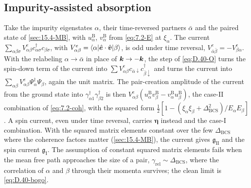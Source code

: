 \subsection*{Impurity-assisted absorption}

Take the impurity eigenstates $\alpha$, their time-reversed partners $\bar\alpha$ and the paired state of \cref{sec:15.4-MB}, with $u^{\mathrm{B}}_\alpha$, $v^{\mathrm{B}}_\alpha$ from \cref{eq:7.2-E} at $\xi_\alpha$. The current $\sum_{\alpha\beta\sigma}V^{e}_{\alpha\beta}c^\dagger_{\alpha\sigma}c_{\beta\sigma}$, with $V^{e}_{\alpha\beta} = \langle\alpha|\hat{\bm{e}}\cdot\hat{\bm{v}}|\beta\rangle$, is odd under time reversal, $V^{e}_{\bar\alpha\bar\beta} = -V^{e}_{\beta\alpha}$. With the relabeling $\alpha \to \bar\alpha$ in place of $\bm{k} \to -\bm{k}$, the step of \cref{eq:D.40-O} turns the spin-down term of the current into $\sum V^{e}_{\alpha\beta}c_{\bar\alpha\downarrow}c^\dagger_{\bar\beta\downarrow}$ and turns the current into $\sum_{\alpha\beta}V^{e}_{\alpha\beta}\Psi^\dagger_\alpha\Psi_\beta$, again the unit matrix. The pair-creation amplitude of the current from the ground state into $\gamma^\dagger_{\alpha1}\gamma^\dagger_{\beta2}$ is then $V^{e}_{\alpha\beta}(u^{\mathrm{B}}_\alpha v^{\mathrm{B}}_\beta - v^{\mathrm{B}}_\alpha u^{\mathrm{B}}_\beta)$, the case-II combination of \cref{eq:7.2-coh}, with the squared form $\frac12[1 - (\xi_\alpha\xi_\beta + \Delta_{\mathrm{BCS}}^2)/E_\alpha E_\beta]$. A spin current, even under time reversal, carries $\boldsymbol{\eta}$ instead and the case-I combination. With the squared matrix elements constant over the few $\Delta_{\mathrm{BCS}}$ where the coherence factors matter (\cref{sec:15.4-MB}), the current gives $\mathfrak{g}_{\mathrm{II}}$ and the spin current $\mathfrak{g}_{\mathrm{I}}$. The assumption of constant squared matrix elements fails when the mean free path approaches the size of a pair, $\gamma_{\mathrm{rel}} \sim \Delta_{\mathrm{BCS}}$, where the correlation of $\alpha$ and $\beta$ through their momenta survives; the clean limit is \cref{eq:D.40-bogo}.
